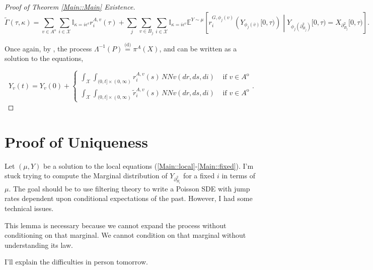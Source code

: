 \documentclass[12pt]{article}
\newcommand{\mb}{\mathbb}
\newcommand{\mc}{\mathcal}
\newcommand{\ov}{\overline}
\newcommand{\te}{\text}
\newcommand{\ep}{\epsilon}
\newcommand{\ind}{\hspace{24pt}}
\newcommand{\exmu}[2]{\mb{E}^{#1}\left[#2\right]}	%
\newcommand{\deq}{\overset{\text{(d)}}{=}}			%
\newcommand{\sta}{\mc{X}}							%
\newcommand{\dneigh}[1]{\partial^2_{#1}}			%
\newcommand{\cl}[1]{\ov{#1}}						%
\newcommand{\Xf}{X}									%
\newcommand{\poiss}{N}								%
\newcommand{\rate}{r}								%
\newcommand{\m}{\mu}								%
\newcommand{\proj}{\pi}								%
\newcommand{\vind}[1]{_{#1}}						%
\newcommand{\tme}[1]{(#1)}							%
\newcommand{\tmi}[1]{#1}							%
\newcommand{\vpara}[1]{^{#1}}						%
\newcommand{\stpara}[1]{_{#1}}						%
\newcommand{\gvpara}[2]{^{#1,#2}}					%
\newcommand{\Xg}{Y}
\newcommand{\inte}[1]{{#1}^\mathrm{o}}
\newcommand{\alt}[1]{\tilde{#1}}
\newcommand{\pmap}{\Lambda}
\newcommand{\rt}{\tau}
\renewcommand{\mark}{\kappa}
\newcommand{\ratee}{\Gamma}
\newcommand{\rp}{P}
\newcommand{\ev}[1]{\ep^{#1}}						%
\begin{document}
\begin{proof}[Proof of Theorem \ref{Main::Main} Existence]
\[\alt{\ratee}(\rt,\mark) = \sum_{v \in \inte{A}}\sum_{i\in \sta} \mb{I}_{\mark = i\ev{v}}\rate\gvpara{A}{v}\stpara{i}\tme{\rt} + \sum_j\sum_{v \in B_j}\sum_{i \in \sta} \mb{I}_{\mark = i\ev{v}}\exmu{\Xg\sim \m}{\rate\gvpara{G}{\phi_j(v)}\stpara{i}\left(\Xg\vind{\phi_j(\cl{v})}\tmi{[0,\rt)}\right)\middle|\Xg\vind{\phi_j(\dneigh{B_j})}\tmi{[0,\rt)} = \Xf\vind{\dneigh{B_j}}\tmi{[0,\rt)}}.\]

Once again, by \cite[Exercise 14.7.1]{DalVer08}, the process \(\pmap^{-1}(\rp) \deq \proj\vpara{A}(\Xf)\), and can be written as a solution to the equations,

\[\Xg\vind{v}\tme{t} = \Xg\vind{v}\tme{0} + \begin{cases}
\int_\sta\int_{(0,t]\times (0,\infty)} \rate\gvpara{A}{v}\stpara{i}\tme{s}\,\poiss\poiss{v}(dr,ds,di) &\te{ if } v \in \inte{A}\\
\int_\sta\int_{(0,t]\times (0,\infty)} \alt{\rate}\gvpara{A}{v}\stpara{i}\tme{s}\,\poiss\poiss{v}(dr,ds,di) &\te{ if } v \in \inte{A}
\end{cases}.\]

\end{proof}

\section{Proof of Uniqueness}

Let \((\mu,\Xg)\) be a solution to the local equations (\eqref{Main::local}-\eqref{Main::fixed}). I'm stuck trying to compute the Marginal distribution of \(\Xg\vind{\dneigh{B_i}}\) for a fixed \(i\) in terms of \(\mu\). The goal should be to use filtering theory to write a Poisson SDE with jump rates dependent upon conditional expectations of the past. However, I had some technical issues.

\ind This lemma is necessary because we cannot expand the process without conditioning on that marginal. We cannot condition on that marginal without understanding its law.

\ind I'll explain the difficulties in person tomorrow.
\newpage


\end{document}
